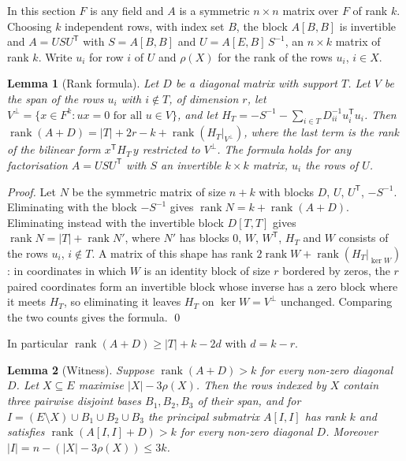 \documentclass[11pt,letterpaper,reqno]{amsart}
\theoremstyle{spaced}
\newtheorem{lemma}{Lemma}
\begin{document}
In this section \(F\) is any field and \(A\) is a symmetric \(n \times n\) matrix over \(F\) of rank \(k\). Choosing \(k\) independent rows, with index set \(B\), the block \(A[B, B]\) is invertible and \(A = U S U^{\mathsf T}\) with \(S = A[B, B]\) and \(U = A[E, B]\,S^{-1}\), an \(n \times k\) matrix of rank \(k\). Write \(u_i\) for row \(i\) of \(U\) and \(\rho(X)\) for the rank of the rows \(u_i\), \(i \in X\).

\begin{lemma}[Rank formula]
Let \(D\) be a diagonal matrix with support \(T\). Let \(V\) be the span of the rows \(u_i\) with \(i \notin T\), of dimension \(r\), let \(V^{\perp} = \{x \in F^k : ux = 0 \text{ for all } u \in V\}\), and let \(H_T = -S^{-1} - \sum_{i \in T} D_{ii}^{-1} u_i^{\mathsf T} u_i\). Then \(\operatorname{rank}(A + D) = \lvert T\rvert + 2r - k + \operatorname{rank}(H_T|_{V^{\perp}})\), where the last term is the rank of the bilinear form \(x^{\mathsf T} H_T\, y\) restricted to \(V^{\perp}\). The formula holds for any factorisation \(A = U S U^{\mathsf T}\) with \(S\) an invertible \(k \times k\) matrix, \(u_i\) the rows of \(U\).
\end{lemma}

\emph{Proof.} Let \(N\) be the symmetric matrix of size \(n + k\) with blocks \(D\), \(U\), \(U^{\mathsf T}\), \(-S^{-1}\). Eliminating with the block \(-S^{-1}\) gives \(\operatorname{rank} N = k + \operatorname{rank}(A + D)\). Eliminating instead with the invertible block \(D[T, T]\) gives \(\operatorname{rank} N = \lvert T\rvert + \operatorname{rank} N'\), where \(N'\) has blocks \(0\), \(W\), \(W^{\mathsf T}\), \(H_T\) and \(W\) consists of the rows \(u_i\), \(i \notin T\). A matrix of this shape has rank \(2\operatorname{rank} W + \operatorname{rank}(H_T|_{\ker W})\): in coordinates in which \(W\) is an identity block of size \(r\) bordered by zeros, the \(r\) paired coordinates form an invertible block whose inverse has a zero block where it meets \(H_T\), so eliminating it leaves \(H_T\) on \(\ker W = V^{\perp}\) unchanged. Comparing the two counts gives the formula. \qed

In particular \(\operatorname{rank}(A + D) \ge \lvert T\rvert + k - 2d\) with \(d = k - r\).

\begin{lemma}[Witness]
Suppose \(\operatorname{rank}(A + D) > k\) for every non-zero diagonal \(D\). Let \(X \subseteq E\) maximise \(\lvert X\rvert - 3\rho(X)\). Then the rows indexed by \(X\) contain three pairwise disjoint bases \(B_1, B_2, B_3\) of their span, and for \(I = (E \setminus X) \cup B_1 \cup B_2 \cup B_3\) the principal submatrix \(A[I, I]\) has rank \(k\) and satisfies \(\operatorname{rank}(A[I, I] + D) > k\) for every non-zero diagonal \(D\). Moreover \(\lvert I\rvert = n - (\lvert X\rvert - 3\rho(X)) \le 3k\).
\end{lemma}
\end{document}
